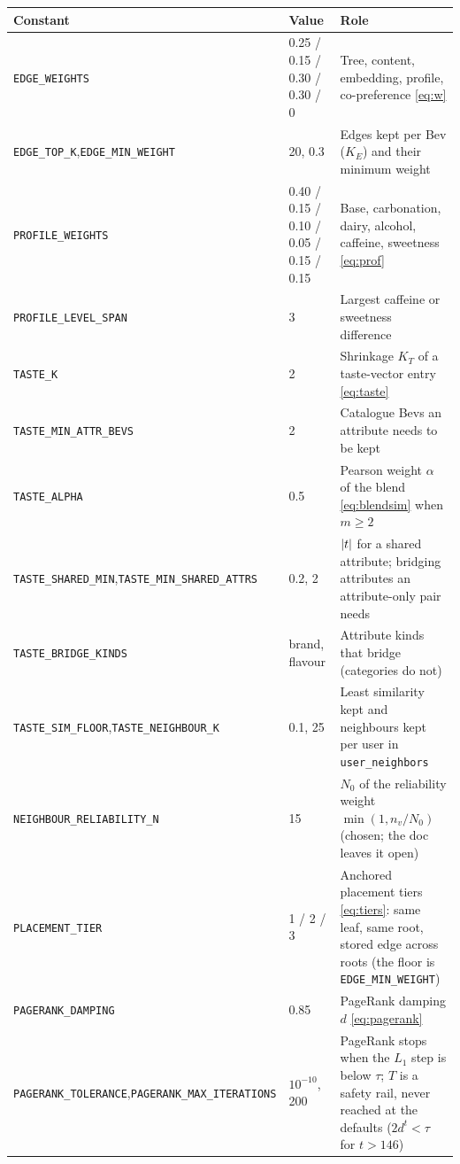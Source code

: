 \documentclass[11pt]{article}
\DeclarePairedDelimiter\abs{\lvert}{\rvert}
\newcommand{\code}[1]{\texttt{#1}}
\theoremstyle{plain}
\theoremstyle{definition}
\theoremstyle{remark}
\begin{document}
\begin{center}
\small
\begin{tabular}{@{}p{5.1cm}p{2.7cm}p{6.6cm}@{}}
\toprule
Constant & Value & Role \\
\midrule
\code{EDGE\_WEIGHTS} & 0.25 / 0.15 / 0.30 / 0.30 / 0 & Tree, content, embedding, profile, co-preference \eqref{eq:w} \\
\code{EDGE\_TOP\_K},\newline \code{EDGE\_MIN\_WEIGHT} & 20, 0.3 & Edges kept per Bev ($K_E$) and their minimum weight \\
\code{PROFILE\_WEIGHTS} & 0.40 / 0.15 / 0.10 / 0.05 / 0.15 / 0.15 & Base, carbonation, dairy, alcohol, caffeine, sweetness \eqref{eq:prof} \\
\code{PROFILE\_LEVEL\_SPAN} & 3 & Largest caffeine or sweetness difference \\
\code{TASTE\_K} & 2 & Shrinkage $K_T$ of a taste-vector entry \eqref{eq:taste} \\
\code{TASTE\_MIN\_ATTR\_BEVS} & 2 & Catalogue Bevs an attribute needs to be kept \\
\code{TASTE\_ALPHA} & 0.5 & Pearson weight $\alpha$ of the blend \eqref{eq:blendsim} when $m \ge 2$ \\
\code{TASTE\_SHARED\_MIN},\newline \code{TASTE\_MIN\_SHARED\_ATTRS} & 0.2, 2 & $\abs{t}$ for a shared attribute; bridging attributes an attribute-only pair needs \\
\code{TASTE\_BRIDGE\_KINDS} & brand, flavour & Attribute kinds that bridge (categories do not) \\
\code{TASTE\_SIM\_FLOOR},\newline \code{TASTE\_NEIGHBOUR\_K} & 0.1, 25 & Least similarity kept and neighbours kept per user in \code{user\_neighbors} \\
\code{NEIGHBOUR\_RELIABILITY\_N} & 15 & $N_0$ of the reliability weight $\min(1, n_v/N_0)$ (chosen; the doc leaves it open) \\
\code{PLACEMENT\_TIER} & 1 / 2 / 3 & Anchored placement tiers \eqref{eq:tiers}: same leaf, same root, stored edge across roots (the floor is \code{EDGE\_MIN\_WEIGHT}) \\
\code{PAGERANK\_DAMPING} & 0.85 & PageRank damping $d$ \eqref{eq:pagerank} \\
\code{PAGERANK\_TOLERANCE},\newline \code{PAGERANK\_MAX\_ITERATIONS} & $10^{-10}$, 200 & PageRank stops when the $L_1$ step is below $\tau$; $T$ is a safety rail, never reached at the defaults ($2d^t < \tau$ for $t > 146$) \\

\end{tabular}
\end{center}
\end{document}
